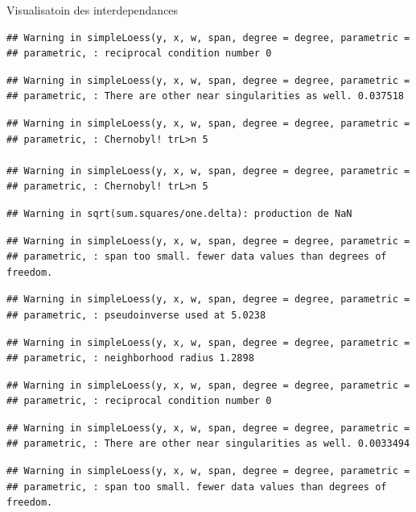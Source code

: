 \documentclass[11pt,ignorenonframetext,]{beamer}
\begin{document}
\begin{frame}[fragile]{Visualisatoin des interdependances}
\begin{verbatim}
## Warning in simpleLoess(y, x, w, span, degree = degree, parametric =
## parametric, : reciprocal condition number 0
\end{verbatim}

\begin{verbatim}
## Warning in simpleLoess(y, x, w, span, degree = degree, parametric =
## parametric, : There are other near singularities as well. 0.037518
\end{verbatim}

\begin{verbatim}
## Warning in simpleLoess(y, x, w, span, degree = degree, parametric =
## parametric, : Chernobyl! trL>n 5

## Warning in simpleLoess(y, x, w, span, degree = degree, parametric =
## parametric, : Chernobyl! trL>n 5
\end{verbatim}

\begin{verbatim}
## Warning in sqrt(sum.squares/one.delta): production de NaN
\end{verbatim}

\begin{verbatim}
## Warning in simpleLoess(y, x, w, span, degree = degree, parametric =
## parametric, : span too small. fewer data values than degrees of freedom.
\end{verbatim}

\begin{verbatim}
## Warning in simpleLoess(y, x, w, span, degree = degree, parametric =
## parametric, : pseudoinverse used at 5.0238
\end{verbatim}

\begin{verbatim}
## Warning in simpleLoess(y, x, w, span, degree = degree, parametric =
## parametric, : neighborhood radius 1.2898
\end{verbatim}

\begin{verbatim}
## Warning in simpleLoess(y, x, w, span, degree = degree, parametric =
## parametric, : reciprocal condition number 0
\end{verbatim}

\begin{verbatim}
## Warning in simpleLoess(y, x, w, span, degree = degree, parametric =
## parametric, : There are other near singularities as well. 0.0033494
\end{verbatim}

\begin{verbatim}
## Warning in simpleLoess(y, x, w, span, degree = degree, parametric =
## parametric, : span too small. fewer data values than degrees of freedom.
\end{verbatim}


\end{frame}
\end{document}
